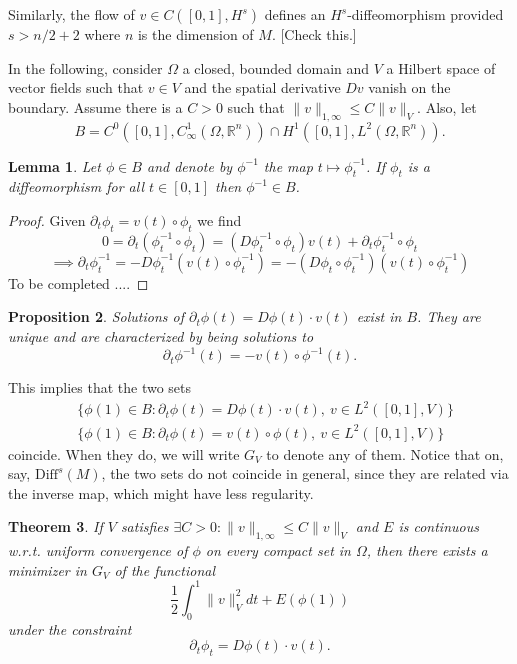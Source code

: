 \documentclass{article}
\theoremstyle{plain}
\newtheorem{teo}{Theorem}[section]
\newtheorem{prop}[teo]{Proposition}
\newtheorem{lem}[teo]{Lemma}
\theoremstyle{definition}
\numberwithin{equation}{section}
\newcommand{\R}{\ensuremath{\mathbb{R}}}
\newcommand{\Diff}{\ensuremath{\mathrm{Diff}}}
\begin{document}
Similarly, the flow of $v\in C([0,1],H^s)$ defines an $H^s$-diffeomorphism provided $s>n/2+2$ where $n$ is the dimension of $M$. [Check this.]

In the following, consider $\Omega$ a closed, bounded domain and $V$ a Hilbert space of vector fields such that $v\in V$ and the spatial derivative $Dv$ vanish on the boundary. Assume there is a $C>0$ such that $\|v\|_{1,\infty}\leq C\|v\|_V$. Also, let
\[
B=C^0([0,1],C^1_\infty(\Omega,\R^n))\cap H^1([0,1],L^2(\Omega,\R^n)).
\]

\begin{lem}
Let $\phi\in B$ and denote by $\phi^{-1}$ the map $t\mapsto \phi_t^{-1}$. If $\phi_t$ is a diffeomorphism for all $t\in[0,1]$ then $\phi^{-1}\in B$.
\end{lem}

\begin{proof}
Given $\partial_t\phi_t = v(t)\circ \phi_t$ we find
\[
 0= \partial_t(\phi^{-1}_t\circ\phi_t )=\left(D\phi^{-1}_t\circ \phi_t\right) v(t)+\partial_t\phi^{-1}_t\circ\phi_t 
\]
\[
\implies \partial_t\phi^{-1}_t=-D\phi_t^{-1} \left(v(t)\circ\phi_t^{-1}\right)=-\left(D\phi_t\circ\phi_t^{-1}\right)\left(v(t)\circ\phi_t^{-1}\right)
\]
To be completed ....
\end{proof}

\begin{prop}
Solutions of $\partial_t\phi(t)=D\phi(t)\cdot v(t)$ exist in $B$. They are unique and are characterized by being solutions to 
\[
\partial_t\phi^{-1}(t)=-v(t)\circ \phi^{-1}(t).
\]
\end{prop}
This implies that the two sets
%
\begin{align*}
&\{\phi(1)\in B : \partial_t\phi(t)=D\phi(t)\cdot v(t),\ v\in L^2([0,1],V)\} \\
&\{\phi(1)\in B : \partial_t\phi(t)=v(t)\circ \phi(t),\ v\in L^2([0,1],V)\}
\end{align*}
%
coincide. When they do, we will write $G_V$ to denote any of them. Notice that on, say, $\Diff^s(M)$, the two sets do not coincide in general, since they are related via the inverse map, which might have less regularity.

\begin{teo}
If $V$ satisfies $\exists C>0: \|v\|_{1,\infty}\leq C\|v\|_V$ and $E$ is continuous w.r.t. uniform convergence of $\phi$ on every compact set in $\Omega$, then there exists a minimizer in $G_V$ of the functional 
\[
  \frac{1}{2}\int_0^1\|v\|^2_Vdt + E(\phi(1))
\]
under the constraint
\[
\partial_t\phi_t=D\phi(t)\cdot v(t).
\]
\end{teo}
\end{document}
